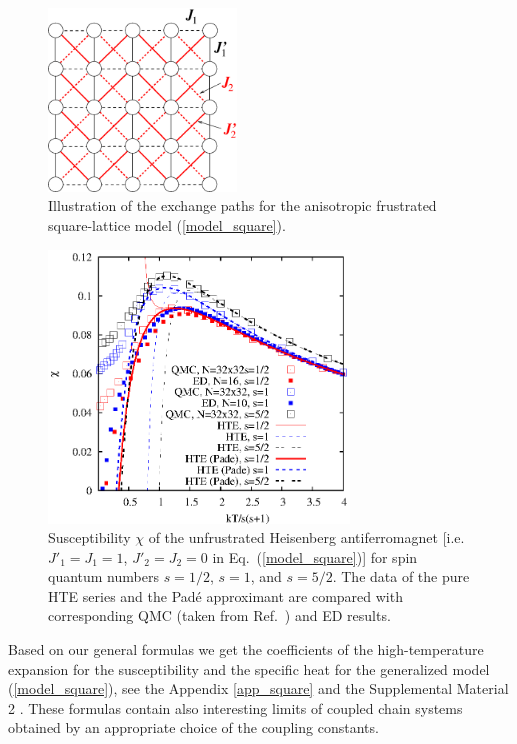 \documentclass[aps,twocolumn,groupedaddress]{revtex4}
\begin{document}
\begin{figure}
\begin{center}
\includegraphics[clip=on,width=50mm,angle=0]{fig5.eps}
\end{center}
\caption{Illustration of the exchange paths for the anisotropic frustrated
square-lattice model (\ref{model_square}).
}
\label{fig_model_square}
\end{figure}
\begin{figure}
\begin{center}
\includegraphics[clip=on,width=80mm,angle=0]{fig6.eps}
\end{center}
\caption{Susceptibility $\chi$ of the unfrustrated Heisenberg
antiferromagnet [i.e. $J'_1=J_1=1$,
$J'_2=J_2=0$ in Eq.~(\ref{model_square})] for spin quantum numbers $s=1/2$, $s=1$, and
$s=5/2$. The data of the pure HTE series and the Pad\'e approximant are
compared with corresponding QMC (taken from Ref.~) and ED
results.
}
\label{vgl_QMC}
\end{figure}

Based on our general formulas we get the coefficients of the high-temperature
expansion for the susceptibility and the specific heat for the generalized
model (\ref{model_square}), see the Appendix \ref{app_square} and the
Supplemental Material 2 \cite{supp2}.
These formulas contain also interesting limits of coupled
chain systems \cite{zinke09,volkova,janson2010,nishimoto2011}
obtained by an appropriate choice of the coupling constants.
\end{document}
